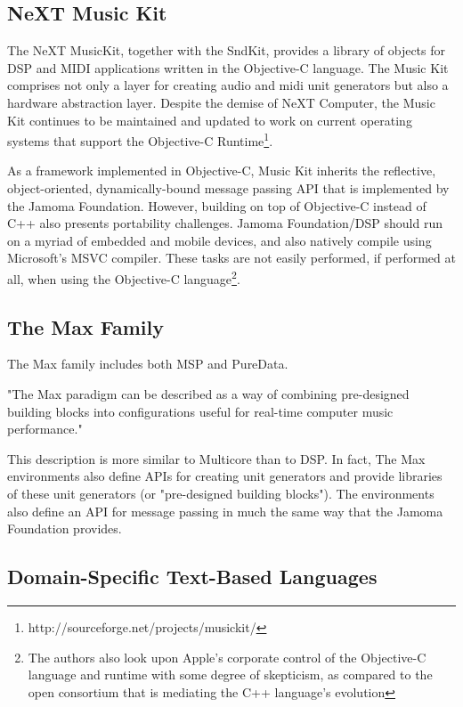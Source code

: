 \documentclass[twoside,10pt]{article}
\begin{document}
\subsection{NeXT Music Kit} %

The NeXT MusicKit, together with the SndKit, provides a library of objects for DSP and MIDI applications written in the Objective-C language\cite{Jaffe:1989,Jaffe:1991}.  The Music Kit comprises not only a layer for creating audio and midi unit generators but also a hardware abstraction layer.  Despite the demise of NeXT Computer, the Music Kit continues to be maintained and updated to work on current operating systems that support the Objective-C Runtime\footnote{http://sourceforge.net/projects/musickit/}.

As a framework implemented in Objective-C, Music Kit inherits the reflective, object-oriented, dynamically-bound message passing API that is implemented by the Jamoma Foundation.  However, building on top of Objective-C instead of C++ also presents portability challenges.  Jamoma Foundation/DSP should run on a myriad of embedded and mobile devices, and also natively compile using Microsoft's MSVC compiler.  These tasks are not easily performed, if performed at all, when using the Objective-C language\footnote{The authors also look upon Apple's corporate control of the Objective-C language and runtime with some degree of skepticism, as compared to the open consortium that is mediating the C++ language's evolution}.

\subsection{The Max Family} %

The Max family includes both MSP\cite{Zicarelli:1998} and PureData\cite{Puckette:1996}.

"The Max paradigm can be described as a way of combining pre-designed building blocks into configurations useful for real-time computer music performance."\cite{Puckette:2002_max_at_17}

This description is more similar to Multicore than to DSP.  In fact, The Max environments also define APIs for creating unit generators and provide libraries of these unit generators (or "pre-designed building blocks").  The environments also define an API for message passing in much the same way that the Jamoma Foundation provides.


\subsection{Domain-Specific Text-Based Languages} %
\end{document}
